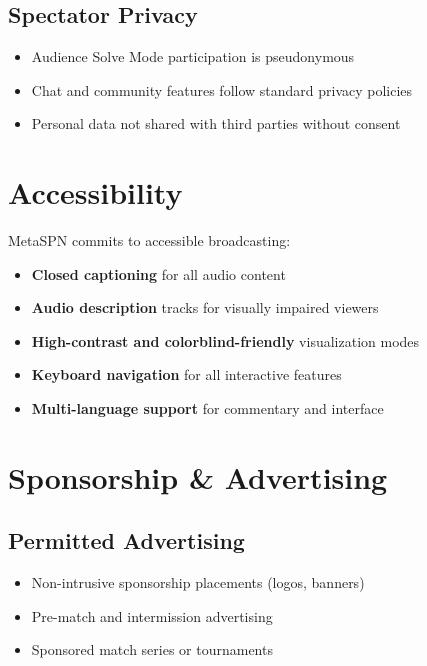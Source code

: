 \subsection{Spectator Privacy}

\begin{itemize}[leftmargin=*]
  \item Audience Solve Mode participation is pseudonymous
  \item Chat and community features follow standard privacy policies
  \item Personal data not shared with third parties without consent
\end{itemize}

\section{Accessibility}

MetaSPN commits to accessible broadcasting:

\begin{itemize}[leftmargin=*]
  \item \textbf{Closed captioning} for all audio content
  \item \textbf{Audio description} tracks for visually impaired viewers
  \item \textbf{High-contrast and colorblind-friendly} visualization modes
  \item \textbf{Keyboard navigation} for all interactive features
  \item \textbf{Multi-language support} for commentary and interface
\end{itemize}

\section{Sponsorship \& Advertising}

\subsection{Permitted Advertising}

\begin{itemize}[leftmargin=*]
  \item Non-intrusive sponsorship placements (logos, banners)
  \item Pre-match and intermission advertising
  \item Sponsored match series or tournaments
\end{itemize}

